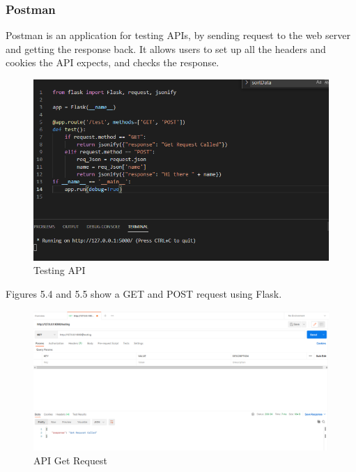 \subsubsection{Postman}
Postman is an application for testing APIs, by sending request to the web server and getting the response back. It allows users to set up all the headers and cookies the API expects, and checks the response.\cite{Postman}

\begin{figure}[H]
    \centering
    \includegraphics[scale=0.4]{img/TestCode.PNG}
    \caption{Testing API}
    \label{fig:my_label10}
\end{figure}

Figures 5.4 and 5.5 show a GET and POST request using Flask.

\begin{figure}[H]
    \centering
    \includegraphics[scale=0.3]{img/TestGet.PNG}
    \caption{API Get Request}
    \label{fig:my_label11}
\end{figure}

